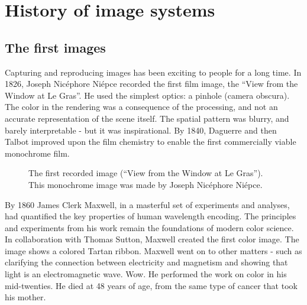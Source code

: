 \documentclass[
  letterpaper,
]{book}
\begin{document}
\section{History of image systems}\label{history-of-image-systems}

\subsection{The first images}\label{the-first-images}

Capturing and reproducing images has been exciting to people for a long
time. In 1826, Joseph Nicéphore Niépce recorded the first film image,
the ``View from the Window at Le Gras''. He used the simplest optics: a
pinhole (camera obscura). The color in the rendering was a consequence
of the processing, and not an accurate representation of the scene
itself. The spatial pattern was blurry, and barely interpretable - but
it was inspirational. By 1840, Daguerre and then Talbot improved upon
the film chemistry to enable the first commercially viable monochrome
film.

\begin{figure}


\caption{\label{fig-window-le-gras}The first recorded image (``View from
the Window at Le Gras''). This monochrome image was made by Joseph
Nicéphore Niépce.}

\end{figure}%

By 1860 James Clerk Maxwell, in a masterful set of experiments and
analyses, had quantified the key properties of human wavelength
encoding. The principles and experiments from his work remain the
foundations of modern color science. In collaboration with Thomas
Sutton, Maxwell created the first color image. The image shows a colored
Tartan ribbon. Maxwell went on to other matters - such as clarifying the
connection between electricity and magnetism and showing that light is
an electromagnetic wave. Wow. He performed the work on color in his
mid-twenties. He died at 48 years of age, from the same type of cancer
that took his mother.
\end{document}

